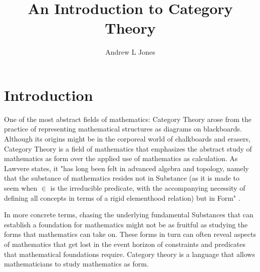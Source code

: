 \documentclass{article}
\title{An Introduction to Category Theory}
\author{Andrew L Jones}\date{}
\begin{document}
\maketitle


\section*{Introduction}
One of the most abstract fields of mathematics: Category Theory arose from the practice of representing mathematical structures as diagrams on blackboards. Although its origins might be in the corporeal world of chalkboards and erasers, Category Theory is a field of mathematics that emphasizes the abstract study of mathematics as form over the applied use of mathematics as calculation. As Lawvere states, it "has long been felt in advanced algebra and topology, namely that the substance of mathematics resides not in Substance (as it is made to seem when $\in$ is the irreducible predicate, with the accompanying necessity of defining all concepts in terms of a rigid elementhood relation) but in Form" \cite{Lawvere01}. 

In more concrete terms, chasing the underlying fundamental Substances that can establish a foundation for mathematics might not be as fruitful as studying the forms that mathematics can take on. These forms in turn can often reveal aspects of mathematics that get lost in the event horizon of constraints and predicates that mathematical foundations require. Category theory is a language that allows mathematicians to study mathematics as form.

\end{document}

